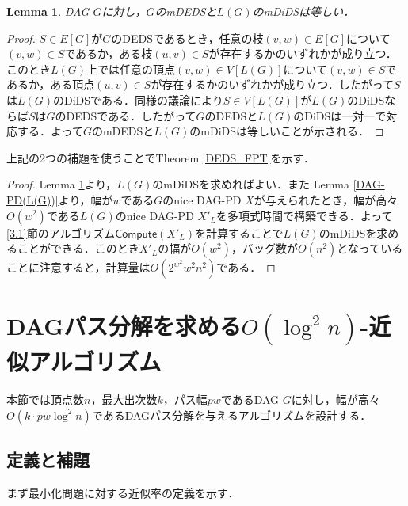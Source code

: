 \documentclass[master]{kuisthesis}		%
\theoremstyle{plain}
\newtheorem{lemma}{Lemma}
\theoremstyle{definition}
\begin{document}
\begin{lemma}\label{mDEDS_mDiDS}
    DAG $G$に対し，$G$のmDEDSと$L(G)$のmDiDSは等しい．
\end{lemma}

\begin{proof}
    $S\in E[G]$が$G$のDEDSであるとき，任意の枝$(v, w) \in E[G]$について$(v, w)\in S$であるか，ある枝$(u, v)\in S$が存在するかのいずれかが成り立つ．このとき$L(G)$上では任意の頂点$(v, w) \in V[L(G)]$について$(v, w)\in S$であるか，ある頂点$(u, v)\in S$が存在するかのいずれかが成り立つ．したがって$S$は$L(G)$のDiDSである．同様の議論により$S\in V[L(G)]$が$L(G)$のDiDSならば$S$は$G$のDEDSである．したがって$G$のDEDSと$L(G)$のDiDSは一対一で対応する．よって$G$のmDEDSと$L(G)$のmDiDSは等しいことが示される．
\end{proof}

上記の2つの補題を使うことでTheorem \ref{DEDS_FPT}を示す．

\begin{proof}
    Lemma \ref{mDEDS_mDiDS}より，$L(G)$のmDiDSを求めればよい．また Lemma \ref{DAG-PD(L(G))}より，幅が$w$である$G$のnice DAG-PD $X$が与えられたとき，幅が高々$O(w^2)$である$L(G)$のnice DAG-PD $X'_L$を多項式時間で構築できる．よって\ref{3.1}節のアルゴリズム$\mathsf{Compute}(X'_L)$を計算することで$L(G)$のmDiDSを求めることができる．このとき$X'_L$の幅が$O(w^2)$，バッグ数が$O(n^2)$となっていることに注意すると，計算量は$O(2^{w^2}w^2n^2)$である．
\end{proof}



















\section{DAGパス分解を求める$O(\log ^2 n)$-近似アルゴリズム} %
本節では頂点数$n$，最大出次数$k$，パス幅$pw$であるDAG $G$に対し，幅が高々$O(k \cdot pw \log ^2 n)$であるDAGパス分解を与えるアルゴリズムを設計する．

\subsection{定義と補題}
まず最小化問題に対する近似率の定義を示す．
\end{document}
